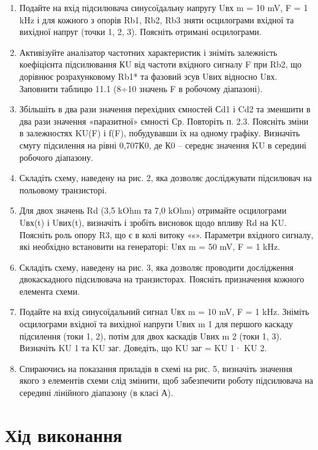 \documentclass{article}
\begin{document}
\begin{normalsize}
\begin{enumerate}
		\item Подайте на вхід підсилювача синусоїдальну напругу Uвх m = 10 mV, F = 1 kHz і для кожного з опорів Rb1, Rb2, Rb3 зняти осцилограми вхідної та вихідної напруг (точки 1, 2, 3). Поясніть отримані осцилограми.
		
		\item Активізуйте аналізатор частотних характеристик і зніміть залежність коефіцієнта підсилювання КU від частоти вхідного сигналу F при Rb2, що дорівнює розрахунковому Rb1* та фазовий зсув Uвих відносно Uвх. Заповнити таблицю 11.1 (8÷10 значень F в робочому діапазоні).
		
		\item Збільшіть в два рази значення перехідних ємностей Сd1 і Cd2 та зменшити в два рази значення «паразитної» ємності Ср. Повторіть п. 2.3. Поясніть зміни в залежностях KU(F) і f(F), побудувавши їх на одному графіку. 
		Визначіть смугу підсилення на рівні 0,707К0, де К0 – середнє значення KU в середині робочого діапазону.
		
		\item Складіть схему, наведену на рис. 2, яка дозволяє досліджувати підсилювач на польовому транзисторі.
		
		\item Для двох значень Rd (3,5 kOhm та 7,0 kOhm) отримайте осцилограми Uвх(t) і Uвих(t), визначіть  і зробіть висновок щодо впливу Rd на KU. Поясніть роль опору R3, що є в колі витоку «s». Параметри вхідного сигналу, які необхідно встановити на генераторі: Uвх m = 50 mV, F = 1 kHz.
		
		\item Складіть схему, наведену на рис. 3, яка дозволяє проводити дослідження двокаскадного підсилювача на транзисторах. Поясніть призначення кожного елемента схеми.
		
		\item Подайте на вхід синусоїдальний сигнал Uвх m = 10 mV, F = 1 kHz. Зніміть осцилограми вхідної та вихідної напруги Uвих m 1 для першого каскаду підсилення (токи 1, 2), потім для двох каскадів Uвих m 2 (токи 1, 3). Визначіть KU 1 та KU заг. Доведіть, що KU заг = KU 1· KU 2.
		
		\item Спираючись на показання приладів в схемі на рис. 5, визначіть значення якого з елементів схеми слід змінити, щоб забезпечити роботу підсилювача на середині лінійного діапазону (в класі А).
	\end{enumerate}

	\section*{Хід виконання}
	

\end{normalsize}
\end{document}
